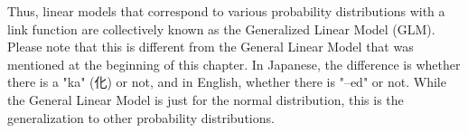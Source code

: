 \documentclass{ltjsbook}
\begin{document}
Thus, linear models that correspond to various probability distributions with a link function are collectively known as the Generalized Linear Model (GLM). Please note that this is different from the General Linear Model that was mentioned at the beginning of this chapter. In Japanese, the difference is whether there is a "ka" (化) or not, and in English, whether there is "--ed" or not. While the General Linear Model is just for the normal distribution, this is the generalization to other probability distributions.
\end{document}
